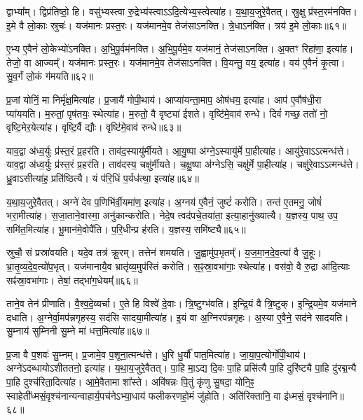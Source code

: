 द्वाभ्या᳚म्।
द्विप्र॑तिष्ठो॒ हि।
वसु॑भ्यस्त्वा रु॒द्रेभ्य॑स्त्वा\-ऽऽदि॒त्येभ्य॒स्त्वेत्या॑ह।
य॒था॒\-य॒जु\-रे॒वै\-तत्।
स्रु॒क्षु प्र॑स्त॒रम॑नक्ति।
इ॒मे वै लो॒काः स्रुचः॑।
यज॑मानः प्रस्त॒रः।
यज॑मानमे॒व तेज॑सा\-ऽनक्ति।
त्रे॒धा\-ऽन॑क्ति।
त्रय॑ इ॒मे लो॒काः॥६१॥

ए॒भ्य ए॒वैनं॑ लो॒केभ्यो॑\-ऽनक्ति।
अ॒भि॒पू॒र्वम॑नक्ति।
अ॒भि॒पू॒र्वमे॒व यज॑मानं॒ तेज॑सा\-ऽनक्ति।
अ॒क्तꣳ रिहा॑णा॒ इत्या॑ह।
तेजो॒ वा आज्यम्᳚।
यज॑मानः प्रस्त॒रः।
यज॑मानमे॒व तेज॑सा\-ऽनक्ति।
वि॒यन्तु॒ वय॒ इत्या॑ह।
वय॑ ए॒वैनं॑ कृ॒त्वा।
सु॒व॒र्गं लो॒कं ग॑मयति॥६२॥

प्र॒जां योनिं॒ मा निर्मृ॑क्ष॒मित्या॑ह।
प्र॒जायै॑ गोपी॒थाय॑।
आप्या॑यन्ता॒माप॒ ओष॑धय॒ इत्या॑ह।
आप॑ ए॒वौष॑धी॒रा प्या॑ययति।
म॒रुतां॒ पृष॑तयः॒ स्थेत्या॑ह।
म॒रुतो॒ वै वृष्ट्या॑ ईशते।
वृष्टि॑मे॒वाव॑ रुन्धे।
दिवं॑ गच्छ॒ ततो॑ नो॒ वृष्टि॒मेर॒येत्या॑ह।
वृष्टि॒र्वै द्यौः।
वृष्टि॑मे॒वाव॑ रुन्धे॥६३॥

याव॒द्वा अ॑ध्व॒र्युः प्र॑स्त॒रं प्र॒हर॑ति।
ताव॑द॒स्यायु॑र्मीयते।
आ॒यु॒ष्पा अ॑ग्ने॒\-ऽस्यायु॑र्मे पा॒हीत्या॑ह।
आयु॑रे॒वाऽऽत्मन्ध॑त्ते।
याव॒द्वा अ॑ध्व॒र्युः प्र॑स्त॒रं प्र॒हर॑ति।
ताव॑दस्य॒ चक्षु॑र्मीयते।
च॒क्षु॒ष्पा अ॑ग्नेऽसि॒ चक्षु॑र्मे पा॒हीत्या॑ह।
चक्षु॑रे॒वाऽऽत्मन्ध॑त्ते।
ध्रु॒वा\-ऽसीत्या॑ह॒ प्रति॑\-ष्ठित्यै।
यं प॑रि॒धिं प॒र्यध॑त्था॒ इत्या॑ह॥६४॥

य॒था॒\-य॒जु\-रे॒वै\-तत्।
अग्ने॑ देव प॒णिभि॑र्वी॒यमा॑ण॒ इत्या॑ह।
अ॒ग्नय॑ ए॒वैनं॒ जुष्टं॑ करोति।
तन्त॑ ए॒तमनु॒ जोषं॑ भरा॒मीत्या॑ह।
स॒जा॒ताने॒वास्मा॒ अनु॑कान्करोति।
नेदे॒ष त्वद॑पचे॒तया॑ता॒ इत्या॒हानु॑ख्यात्यै।
य॒ज्ञस्य॒ पाथ॒ उप॒ समि॑त॒मित्या॑ह।
भू॒मान॑मे॒वोपै॑ति।
प॒रि॒धीन्प्र ह॑रति।
य॒ज्ञस्य॒ समि॑ष्ट्यै॥६५॥

स्रुचौ॒ सं प्रस्रा॑वयति।
यदे॒व तत्र॑ क्रू॒रम्।
तत्तेन॑ शमयति।
जु॒ह्वामु॑प॒भृतम्᳚।
य॒ज॒मा॒न॒दे॒व॒त्या॑ वै जु॒हूः।
भ्रा॒तृ॒व्य॒दे॒व॒त्यो॑प॒भृत्।
यज॑मानायै॒व भ्रातृ॑व्य॒मुप॑स्तिं करोति।
स॒ꣴ॒स्रा॒वभा॑गाः॒ स्थेत्या॑ह।
वस॑वो॒ वै रु॒द्रा आ॑दि॒त्याः सꣴ॑स्रा॒वभा॑गाः।
तेषां॒ तद्भा॑ग॒धेयम्᳚॥६६॥

ताने॒व तेन॑ प्रीणाति।
वै॒श्व॒दे॒व्यर्चा।
ए॒ते हि विश्वे॑ दे॒वाः।
त्रि॒ष्टुग्भ॑वति।
इ॒न्द्रि॒यं वै त्रि॒ष्टुक्।
इ॒न्द्रि॒यमे॒व यज॑माने दधाति।
अ॒ग्नेर्वा॒मप॑न्नगृहस्य॒ सद॑सि सादया॒मीत्या॑ह।
इ॒यं वा अ॒ग्निरप॑न्नगृहः।
अ॒स्या ए॒वैने॒ सद॑ने सादयति।
सु॒म्नाय॑ सुम्निनी सु॒म्ने मा॑ धत्त॒मित्या॑ह॥६७॥

प्र॒जा वै प॒शवः॑ सु॒म्नम्।
प्र॒जामे॒व प॒शूना॒त्मन्ध॑त्ते।
धु॒रि धु॒र्यौ॑ पात॒मित्या॑ह।
जा॒या॒प॒त्योर्गो॑पी॒थाय॑।
अग्ने॑\-ऽदब्धायो\-ऽशीततनो॒ इत्या॑ह।
य॒था॒\-य॒जु\-रे॒वै\-तत्।
पा॒हि मा॒ऽद्य दि॒वः पा॒हि प्रसि॑त्यै पा॒हि दुरि॑ष्ट्यै पा॒हि दु॑रद्म॒न्यै पा॒हि दुश्च॑रिता॒दित्या॑ह।
आ॒\-मे॒वैतामा शा᳚स्ते।
अवि॑षन्नः पि॒तुं कृ॑णु सु॒षदा॒ योनि॒ꣴ॒ स्वाहेती᳚ध्मसं॒वृश्च॑नान्यन्वाहार्य॒पच॑ने\-ऽभ्या॒धाय॑ फलीकरणहो॒मं जु॑होति।
अति॑रिक्तानि॒ वा इ॑ध्मसं॒ वृश्च॑नानि॥६८॥

